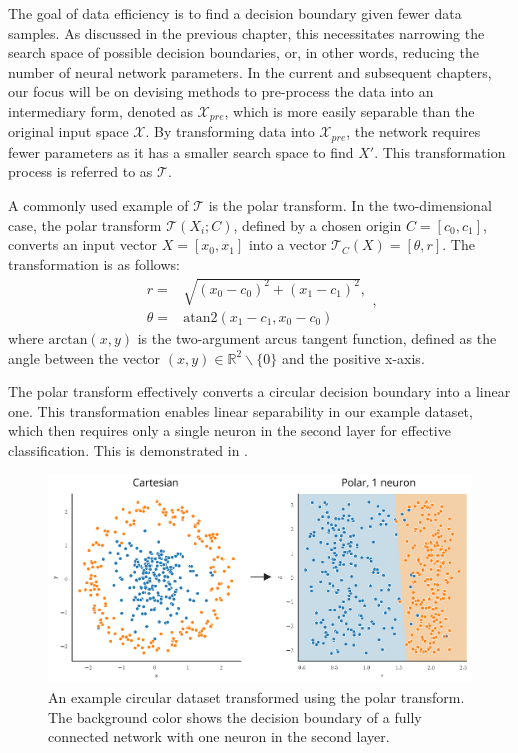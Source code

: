 
The goal of data efficiency is to find a decision boundary given fewer data samples. As discussed in the previous chapter, this necessitates narrowing the search space of possible decision boundaries, or, in other words, reducing the number of neural network parameters. In the current and subsequent chapters, our focus will be on devising methods to pre-process the data into an intermediary form, denoted as \(\mathcal{X}_{pre}\), which is more easily separable than the original input space \(\mathcal{X}\). By transforming data into \(\mathcal{X}_{pre}\), the network requires fewer parameters as it has a smaller search space to find \(X'\). This transformation process is referred to as \(\mathcal{T}\).

A commonly used example of $\mathcal{T}$ is the polar transform. In the two-dimensional case, the polar transform \(\mathcal{T}(X_i; C)\), defined by a chosen origin \(C = [c_0, c_1]\), converts an input vector \(X = [x_0, x_1]\) into a vector \(\mathcal{T}_C(X) = [\theta, r]\). The transformation is as follows:
\begin{equation}
    \begin{aligned}
	r =& \sqrt{(x_0 - c_0)^2 + (x_1 - c_1)^2},\\
	\theta =& \mathrm{atan2}(x_1 - c_1, x_0 - c_0)
    \end{aligned},
\end{equation}
where $\mathrm{arctan}(x, y)$ is the two-argument arcus tangent function, defined as the angle between the vector $(x, y) \in \mathbb{R}^2 \backslash\{0\}$ and the positive x-axis.

The polar transform effectively converts a circular decision boundary into a linear one. This transformation enables linear separability in our example dataset, which then requires only a single neuron in the second layer for effective classification. This is demonstrated in .

	\begin{figure}[t!]
		\centering
		\includegraphics[width=0.65\linewidth]{images/4/polar_dataset_neurons}
		\caption{An example circular dataset transformed using the polar transform. The background color shows the decision boundary of a fully connected network with one neuron in the second layer.}
		\label{fig:polar_dataset_neurons}
	\end{figure}
	
